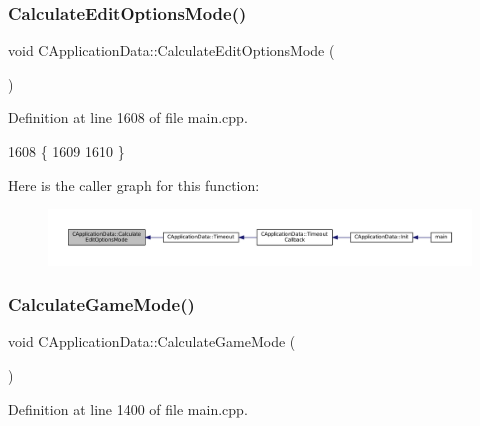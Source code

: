 \subsubsection{\texorpdfstring{Calculate\+Edit\+Options\+Mode()}{CalculateEditOptionsMode()}}
{\footnotesize\ttfamily void C\+Application\+Data\+::\+Calculate\+Edit\+Options\+Mode (\begin{DoxyParamCaption}{ }\end{DoxyParamCaption})\hspace{0.3cm}{\ttfamily [protected]}}



Definition at line 1608 of file main.\+cpp.


\begin{DoxyCode}
1608                                                \{
1609 
1610 \}
\end{DoxyCode}
Here is the caller graph for this function\+:\nopagebreak
\begin{figure}[H]
\begin{center}
\leavevmode
\includegraphics[width=350pt]{classCApplicationData_a9fa1176cd629742424f29ab20c212142_icgraph}
\end{center}
\end{figure}
\hypertarget{classCApplicationData_a782d7204356ef9560deedd54320d4f16}{}\label{classCApplicationData_a782d7204356ef9560deedd54320d4f16} 
\subsubsection{\texorpdfstring{Calculate\+Game\+Mode()}{CalculateGameMode()}}
{\footnotesize\ttfamily void C\+Application\+Data\+::\+Calculate\+Game\+Mode (\begin{DoxyParamCaption}{ }\end{DoxyParamCaption})\hspace{0.3cm}{\ttfamily [protected]}}



Definition at line 1400 of file main.\+cpp.


